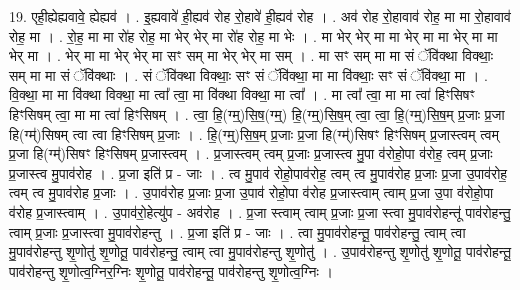 \documentclass[17pt]{extarticle}
\begin{document}
19. एही॒ह्येह्यवावे॒ ह्येह्यव॑ । . इ॒ह्यवावे॑ ही॒ह्यव॑ रोह रो॒हावे॑ ही॒ह्यव॑ रोह । . अव॑ रोह रो॒हावाव॑ रोह॒ मा मा रो॒हावाव॑ रोह॒ मा । . रो॒ह॒ मा मा रो॑ह रोह॒ मा भेर् भेर् मा रो॑ह रोह॒ मा भेः । . मा भेर् भेर् मा मा भेर् मा मा भेर् मा मा भेर् मा । . भेर् मा मा भेर् भेर् मा सꣳ सम् मा भेर् भेर् मा सम् । . मा सꣳ सम् मा मा सं ॅवि॑क्था विक्थाः॒ सम् मा मा सं ॅवि॑क्थाः । . सं ॅवि॑क्था विक्थाः॒ सꣳ सं ॅवि॑क्था॒ मा मा वि॑क्थाः॒ सꣳ सं ॅवि॑क्था॒ मा । . वि॒क्था॒ मा मा वि॑क्था विक्था॒ मा त्वा᳚ त्वा॒ मा वि॑क्था विक्था॒ मा त्वा᳚ । . मा त्वा᳚ त्वा॒ मा मा त्वा॑ हिꣳसिषꣳ हिꣳसिषम् त्वा॒ मा मा त्वा॑ हिꣳसिषम् । . त्वा॒ हि॒(ग्म्॒)सि॒ष॒(ग्म्॒) हि॒(ग्म्॒)सि॒ष॒म् त्वा॒ त्वा॒ हि॒(ग्म्॒)सि॒ष॒म् प्र॒जाः प्र॒जा हि(ग्म्॑)सिषम् त्वा त्वा हिꣳसिषम् प्र॒जाः । . हि॒(ग्म्॒)सि॒ष॒म् प्र॒जाः प्र॒जा हि(ग्म्॑)सिषꣳ हिꣳसिषम् प्र॒जास्त्वम् त्वम् प्र॒जा हि(ग्म्॑)सिषꣳ हिꣳसिषम् प्र॒जास्त्वम् । . प्र॒जास्त्वम् त्वम् प्र॒जाः प्र॒जास्त्व मु॒पा व॑रोहो॒पा व॑रोह॒ त्वम् प्र॒जाः प्र॒जास्त्व मु॒पाव॑रोह । . प्र॒जा इति॑ प्र - जाः । . त्व मु॒पाव॑ रोहो॒पाव॑रोह॒ त्वम् त्व मु॒पाव॑रोह प्र॒जाः प्र॒जा उ॒पाव॑रोह॒ त्वम् त्व मु॒पाव॑रोह प्र॒जाः । . उ॒पाव॑रोह प्र॒जाः प्र॒जा उ॒पाव॑ रोहो॒पा व॑रोह प्र॒जास्त्वाम् त्वाम् प्र॒जा उ॒पा व॑रोहो॒पा व॑रोह प्र॒जास्त्वाम् । . उ॒पाव॑रो॒हेत्यु॑प - अव॑रोह । . प्र॒जा स्त्वाम् त्वाम् प्र॒जाः प्र॒जा स्त्वा मु॒पाव॑रोहन्तू॑ पाव॑रोहन्तु॒ त्वाम् प्र॒जाः प्र॒जास्त्वा मु॒पाव॑रोहन्तु । . प्र॒जा इति॑ प्र - जाः । . त्वा मु॒पाव॑रोहन्तू॒ पाव॑रोहन्तु॒ त्वाम् त्वा मु॒पाव॑रोहन्तु शृ॒णोतु॑ शृ॒णोतू॒ पाव॑रोहन्तु॒ त्वाम् त्वा मु॒पाव॑रोहन्तु शृ॒णोतु॑ । . उ॒पाव॑रोहन्तु शृ॒णोतु॑ शृ॒णोतू॒ पाव॑रोहन्तू॒ पाव॑रोहन्तु शृ॒णोत्व॒ग्निर॒ग्निः शृ॒णोतू॒ पाव॑रोहन्तू॒ पाव॑रोहन्तु शृ॒णोत्व॒ग्निः । \newline
\end{document}
